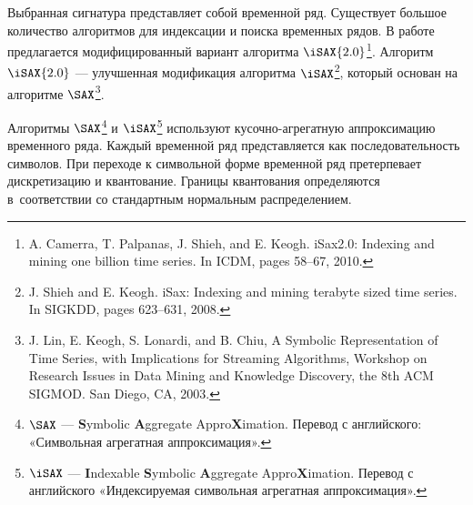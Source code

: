 \documentclass{.local/lib/classes/ndvr-super-article-standalone}
\begin{document}
    
    Выбранная сигнатура представляет собой временной ряд.
    Существует большое количество алгоритмов для индексации
    и поиска временных рядов.
    В работе предлагается модифицированный вариант 
    алгоритма \textit{$\iSAX{2.0}$}\footnote{
        A. Camerra, T. Palpanas, J. Shieh, and E. Keogh. 
        iSax2.0: Indexing and mining one billion time series. 
        In ICDM, pages 58–67, 2010.
    }.
    Алгоритм $\iSAX{2.0}$ — улучшенная модификация алгоритма
    $\iSAX$\footnote{
        J. Shieh and E. Keogh. 
        iSax: Indexing and mining terabyte sized time series. 
        In SIGKDD, pages 623–631, 2008.
    },
    который основан на алгоритме 
    $\SAX$\footnote{
        J. Lin, E. Keogh, S. Lonardi, and B. Chiu, 
        A Symbolic Representation of Time Series, 
        with Implications for Streaming Algorithms, 
        Workshop on Research Issues in Data Mining and
        Knowledge Discovery, 
        the 8th ACM SIGMOD. San Diego, CA, 2003. 
    }.

    Алгоритмы 
    $\SAX$\footnote{
        $\SAX$ —  \textbf{S}ymbolic \textbf{A}ggregate  
        Appro\textbf{X}imation. 
        Перевод с английского: 
        «Символьная агрегатная аппроксимация».
    }
    и
    $\iSAX$\footnote{
        $\iSAX$ — \textbf{I}ndexable \textbf{S}ymbolic 
        \textbf{A}ggregate  Appro\textbf{X}imation.
        Перевод с английского 
        «Индексируемая символьная агрегатная аппроксимация».
    } 
    используют кусочно-агрегатную аппроксимацию 
    временного ряда. Каждый временной ряд представляется
    как последовательность символов.
    При переходе к символьной форме временной ряд 
    претерпевает дискретизацию и квантование.
    Границы квантования определяются в~соответствии 
    со стандартным нормальным распределением.
\end{document}
